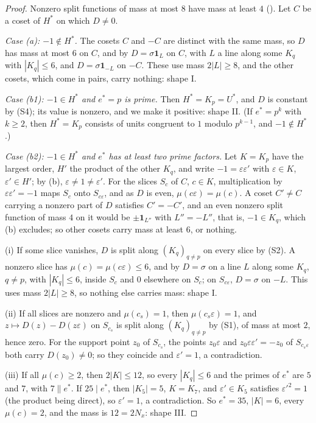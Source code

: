 \begin{proof}
Nonzero split functions of mass at most $8$ have mass at least $4$
(). Let $C$ be a coset of $H^{*}$ on which $D\ne0$.

\emph{Case (a): $-1\notin H^{*}$.} The cosets $C$ and $-C$ are distinct with
the same mass, so $D$ has mass at most $6$ on $C$, and by 
$D=\sigma\mathbf 1_{L}$ on $C$, with $L$ a line along some $K_{q}$ with
$|K_{q}|\le6$, and $D=\sigma\mathbf 1_{-L}$ on $-C$. These use mass
$2|L|\ge8$, and the other cosets, which come in pairs, carry nothing: shape I.

\emph{Case (b1): $-1\in H^{*}$ and $e^{*}=p$ is prime.} Then
$H^{*}=K_{p}=U^{*}$, and $D$ is constant by (S4); its value is nonzero, and
we make it positive: shape II. (If $e^{*}=p^{k}$ with $k\ge2$, then
$H^{*}=K_{p}$ consists of units congruent to $1$ modulo $p^{k-1}$, and
$-1\notin H^{*}$.)

\emph{Case (b2): $-1\in H^{*}$ and $e^{*}$ has at least two prime factors.}
Let $K=K_{p}$ have the largest order, $H'$ the product of the other $K_{q}$,
and write $-1=\varepsilon\varepsilon'$ with $\varepsilon\in K$,
$\varepsilon'\in H'$; by (b), $\varepsilon\ne1\ne\varepsilon'$.
For the slices $S_{c}$ of $C$, $c\in K$, multiplication by
$\varepsilon\varepsilon'=-1$ maps $S_{c}$ onto $S_{c\varepsilon}$, and as
$D$ is even, $\mu(c\varepsilon)=\mu(c)$. A coset $C'\ne C$ carrying a nonzero
part of $D$ satisfies $C'=-C'$, and an even nonzero split function of mass $4$
on it would be $\pm\mathbf 1_{L''}$ with $L''=-L''$, that is, $-1\in K_{q}$,
which (b) excludes; so other cosets carry mass at least $6$, or
nothing.

(i) If some slice vanishes, $D$ is split along $(K_{q})_{q\ne p}$ on every
slice by (S2). A nonzero slice has $\mu(c)=\mu(c\varepsilon)\le6$, and by
 $D=\sigma$ on a line $L$ along some $K_{q}$, $q\ne p$, with
$|K_{q}|\le6$, inside $S_{c}$ and $0$ elsewhere on $S_{c}$; on
$S_{c\varepsilon}$, $D=\sigma$ on $-L$. This uses mass $2|L|\ge8$, so nothing
else carries mass: shape I.

(ii) If all slices are nonzero and $\mu(c_{s})=1$, then $\mu(c_{s}
\varepsilon)=1$, and $z\mapsto D(z)-D(z\varepsilon)$ on $S_{c_{s}}$ is split
along $(K_{q})_{q\ne p}$ by (S1), of mass at most $2$, hence zero. For the
support point $z_{0}$ of $S_{c_{s}}$, the points $z_{0}\varepsilon$ and
$z_{0}\varepsilon\varepsilon'=-z_{0}$ of $S_{c_{s}\varepsilon}$ both carry
$D(z_{0})\ne0$; so they coincide and $\varepsilon'=1$, a contradiction.

(iii) If all $\mu(c)\ge2$, then $2|K|\le12$, so every $|K_{q}|\le6$ and the
primes of $e^{*}$ are $5$ and $7$, with $7\parallel e^{*}$. If $25\mid e^{*}$,
then $|K_{5}|=5$, $K=K_{7}$, and $\varepsilon'\in K_{5}$ satisfies
$\varepsilon'^{2}=1$ (the product being direct), so $\varepsilon'=1$, a
contradiction. So $e^{*}=35$, $|K|=6$, every $\mu(c)=2$, and the mass is
$12=2N_{x}$: shape III.
\end{proof}

